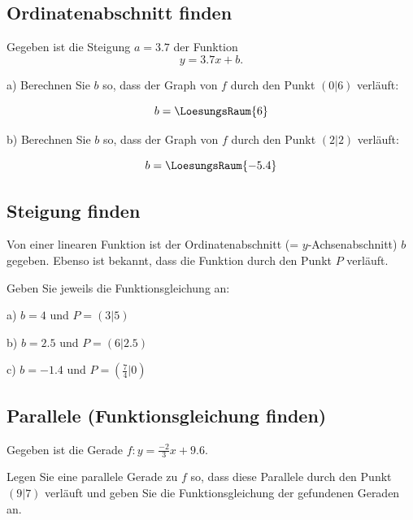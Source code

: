 \subsection{Ordinatenabschnitt finden}
Gegeben ist die Steigung $a=3.7$ der Funktion
$$y=3.7x + b.$$

a) Berechnen Sie $b$ so, dass der Graph von $f$ durch den Punkt $(0|6)$
verläuft:

$$b = \LoesungsRaum{6}$$



b) Berechnen Sie $b$ so, dass der Graph von $f$ durch den Punkt
$(2|2)$ verläuft:

$$b= \LoesungsRaum{-5.4}$$


\subsection{Steigung finden}

Von einer linearen Funktion ist der Ordinatenabschnitt (=
$y$-Achsenabschnitt) $b$ gegeben. Ebenso ist bekannt, dass die
Funktion durch den Punkt $P$ verläuft.

Geben Sie jeweils die Funktionsgleichung an:

a) $b=4$ und $P=(3|5)$


b) $b=2.5$ und $P=(6|2.5)$


c) $b=-1.4$ und $P=(\frac74|0)$


\subsection{Parallele (Funktionsgleichung finden)}

Gegeben ist die Gerade $f: y=\frac{-2}3x+9.6$.

Legen Sie eine parallele Gerade zu $f$ so, dass diese Parallele durch
den Punkt $(9|7)$ verläuft und geben Sie die Funktionsgleichung der
gefundenen Geraden an.

\vspace{15mm}


